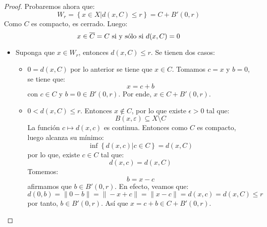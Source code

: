 \documentclass[12pt]{report}
\newcounter{it}
\theoremstyle{largebreak}
\begin{document}
\begin{proof}
        Probaremos ahora que:
        \begin{equation*}
            W_r=\left\{x\in X\Big|d(x,C)\leq r \right\}=C+B'(0,r)
        \end{equation*}
        Como $C$ es compacto, es cerrado. Luego:
        \begin{equation*}
            x\in\overline{C}=C\textup{ si y sólo si }d(x,C)=0
        \end{equation*}
        \begin{itemize}
            \item Suponga que $x\in W_r$, entonces $d(x,C)\leq r$. Se tienen dos casos:
            \begin{itemize}
                \item $0=d(x,C)$ por lo anterior se tiene que $x\in C$. Tomamos $c=x$ y $b=0$, se tiene que:
                \begin{equation*}
                    x=c+b
                \end{equation*}
                con $c\in C$ y $b=0\in B'(0,r)$. Por ende, $x\in C+B'(0,r)$.
                \item $0<d(x,C)\leq r$. Entonces $x\notin C$, por lo que existe $\epsilon>0$ tal que:
                \begin{equation*}
                    B(x,\varepsilon)\subseteq X\setminus C
                \end{equation*}
                La función $c\mapsto d(x,c)$ es continua. Entonces como $C$ es compacto, luego alcanza su mínimo:
                \begin{equation*}
                    \inf\left\{d(x,c)\Big|c\in C \right\}=d(x,C)
                \end{equation*}
                por lo que, existe $c\in C$ tal que:
                \begin{equation*}
                    d(x,c)=d(x,C)
                \end{equation*}
                Tomemos:
                \begin{equation*}
                    b=x-c
                \end{equation*}
                afirmamos que $b\in B'(0,r)$. En efecto, veamos que:
                \begin{equation*}
                    d(0,b)=\|0-b\|=\|-x+c\|=\|x-c\|=d(x,c)=d(x,C)\leq r
                \end{equation*}
                por tanto, $b\in B'(0,r)$. Así que $x=c+b\in C+B'(0,r)$.
            \end{itemize}

\end{itemize}
\end{proof}
\end{document}
